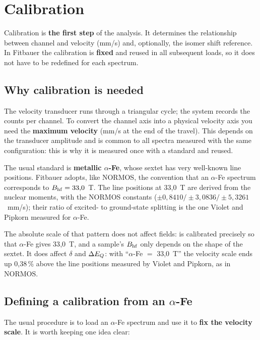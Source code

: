 \chapter{Calibration}
\label{ch:calibracion}

Calibration is \textbf{the first step} of the analysis. It determines the
relationship between channel and velocity (mm/s) and, optionally, the isomer
shift reference. In Fitbauer the calibration is \textbf{fixed} and reused in all
subsequent loads, so it does not have to be redefined for each spectrum.

\section{Why calibration is needed}

The velocity transducer runs through a triangular cycle; the system records the
counts per channel. To convert the channel axis into a physical velocity axis
you need the \textbf{maximum velocity}  (mm/s at the end of the
travel). This  depends on the transducer amplitude and is common to
all spectra measured with the same configuration: this is why it is measured
once with a standard and reused.

The usual standard is \textbf{metallic $\alpha$-Fe}, whose sextet has very
well-known line positions. Fitbauer adopts, like NORMOS, the convention that an
$\alpha$-Fe spectrum corresponds to $B_{\mathrm{hf}} = 33{,}0$~T. The line positions at
33{,}0~T are derived from the nuclear moments, with the NORMOS constants
($\pm0{,}8410 / \pm3{,}0836 / \pm5{,}3261$~mm/s); their ratio of excited- to
ground-state splitting is the one Violet and Pipkorn measured for $\alpha$-Fe.

\begin{nota}
The absolute scale of that pattern does not affect fields:  is
calibrated precisely so that $\alpha$-Fe gives 33{,}0~T, and a sample's $B_{\mathrm{hf}}$ only
depends on the shape of the sextet. It does affect $\delta$ and $\Delta E_{Q}$: with
``$\alpha$-Fe $=$ 33{,}0~T'' the velocity scale ends up 0{,}38\,\% above the line
positions measured by Violet and Pipkorn, as in NORMOS.
\end{nota}

\section{Defining a calibration from an $\alpha$-Fe}
\label{sec:definir-calib}

The usual procedure is to load an $\alpha$-Fe spectrum and use it to \textbf{fix
the velocity scale}. It is worth keeping one idea clear:

